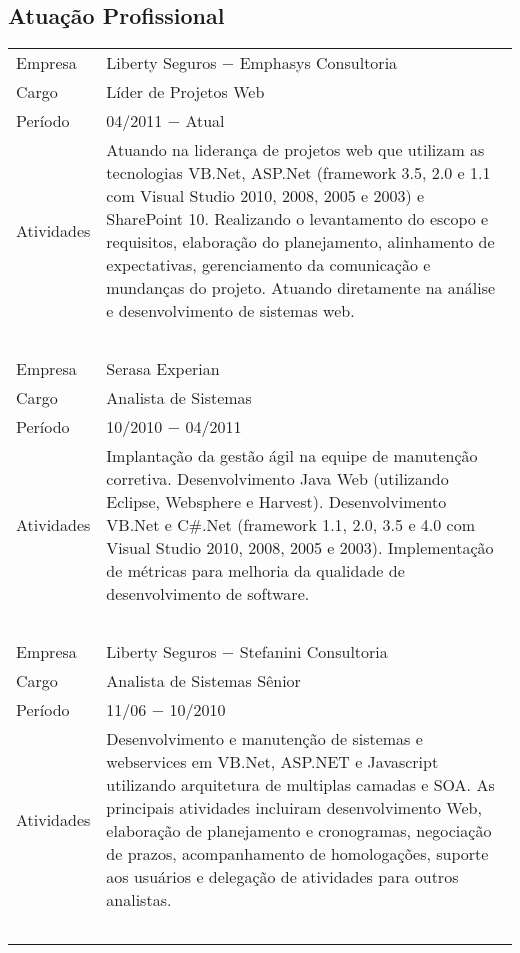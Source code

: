 \documentclass[a4paper, oneside, final]{scrartcl}
\begin{document}
\begin{center}
\section{Atuação Profissional}

\begin{tabularx}{0.97\linewidth}{p{2cm}X}

Empresa     & Liberty Seguros $-$ Emphasys Consultoria \\
Cargo       & Líder de Projetos Web \\
Período     & 04/2011 $-$ Atual \\
Atividades  & Atuando na liderança de projetos web que utilizam as tecnologias VB.Net, ASP.Net (framework 3.5, 2.0 e 1.1 com Visual Studio 2010, 2008, 2005 e 2003) e SharePoint 10. Realizando o levantamento do escopo e requisitos, elaboração do planejamento, alinhamento de expectativas, gerenciamento da comunicação e mundanças do projeto. Atuando diretamente na análise e desenvolvimento de sistemas web. \\
            & \ \\

Empresa     & Serasa Experian\\
Cargo       & Analista de Sistemas\\
Período     & 10/2010 $-$ 04/2011\\
Atividades  & Implantação da gestão ágil na equipe de manutenção corretiva. Desenvolvimento Java Web (utilizando Eclipse, Websphere e Harvest). Desenvolvimento VB.Net e C\#.Net (framework 1.1, 2.0, 3.5 e 4.0 com Visual Studio 2010, 2008, 2005 e 2003). Implementação de métricas para melhoria da qualidade de desenvolvimento de software. \\
            & \ \\

Empresa     & Liberty Seguros $-$ Stefanini Consultoria \\
Cargo       & Analista de Sistemas Sênior \\
Período     & 11/06 $-$ 10/2010 \\
Atividades  & Desenvolvimento e manutenção de sistemas e webservices em VB.Net, ASP.NET e Javascript utilizando arquitetura de multiplas camadas e SOA. As principais atividades incluiram desenvolvimento Web, elaboração de planejamento e cronogramas, negociação de prazos, acompanhamento de homologações, suporte aos usuários e delegação de atividades para outros analistas. \\
            & \ \\


\end{tabularx}
\end{center}
\end{document}
